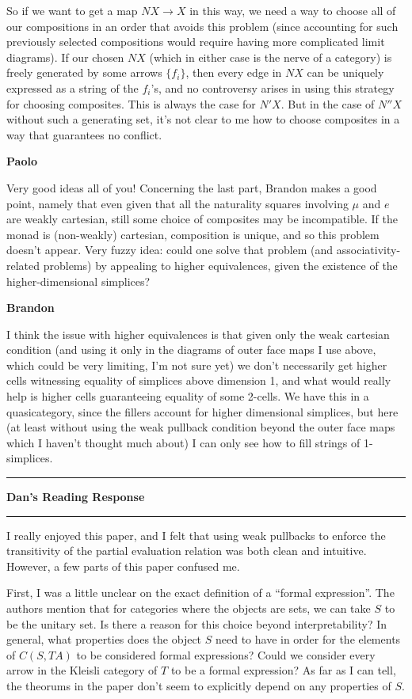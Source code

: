 \documentclass{amsart}
\newcommand{\iam}[1]{
  \vspace{0.25em}
  \hrule
  \vspace{0.25em}
  \textbf{{#1}'s Reading Response}
  \vspace{0.25em}
  \hrule
  \vspace{1em}
}
\newcommand{\respond}[1]{
  \vspace{1em} \textbf{#1}
}
\begin{document}
So if we want to get a map $NX \to X$ in this way, we need a way to choose all of our compositions in an order that avoids this problem (since accounting for such previously selected compositions would require having more complicated limit diagrams).  If our chosen $NX$ (which in either case is the nerve of a category) is freely generated by some arrows $\{f_i\}$, then every edge in $NX$ can be uniquely expressed as a string of the $f_i$'s, and no controversy arises in using this strategy for choosing composites.  This is always the case for $N'X$. But in the case of $N''X$ without such a generating set, it's not clear to me how to choose composites in a way that guarantees no conflict.


\respond{Paolo}

Very good ideas all of you! Concerning the last part, Brandon makes a good point, namely that even given that all the naturality squares involving $\mu$ and $e$ are weakly cartesian, still some choice of composites may be incompatible. If the monad is (non-weakly) cartesian, composition is unique, and so this problem doesn't appear.
Very fuzzy idea: could one solve that problem (and associativity-related problems) by appealing to higher equivalences, given the existence of the higher-dimensional simplices?

\respond{Brandon}

I think the issue with higher equivalences is that given only the weak cartesian condition (and using it only in the diagrams of outer face maps I use above, which could be very limiting, I'm not sure yet) we don't necessarily get higher cells witnessing equality of simplices above dimension 1, and what would really help is higher cells guaranteeing equality of some 2-cells.  We have this in a quasicategory, since the fillers account for higher dimensional simplices, but here (at least without using the weak pullback condition beyond the outer face maps which I haven't thought much about) I can only see how to fill strings of 1-simplices.


\iam{Dan}


I really enjoyed this paper, and I felt that using weak pullbacks to enforce the transitivity of the partial evaluation relation was both clean and intuitive. However, a few parts of this paper confused me.

First, I was a little unclear on the exact definition of a ``formal expression''. The authors mention that for categories where the objects are sets, we can take $S$ to be the unitary set. Is there a reason for this choice beyond interpretability? In general, what properties does the object $S$ need to have in order for the elements of $C(S, TA)$ to be considered formal expressions? Could we consider every arrow in the Kleisli category of $T$ to be a formal expression? As far as I can tell, the theorums in the paper don't seem to explicitly depend on any properties of $S$.
\end{document}
